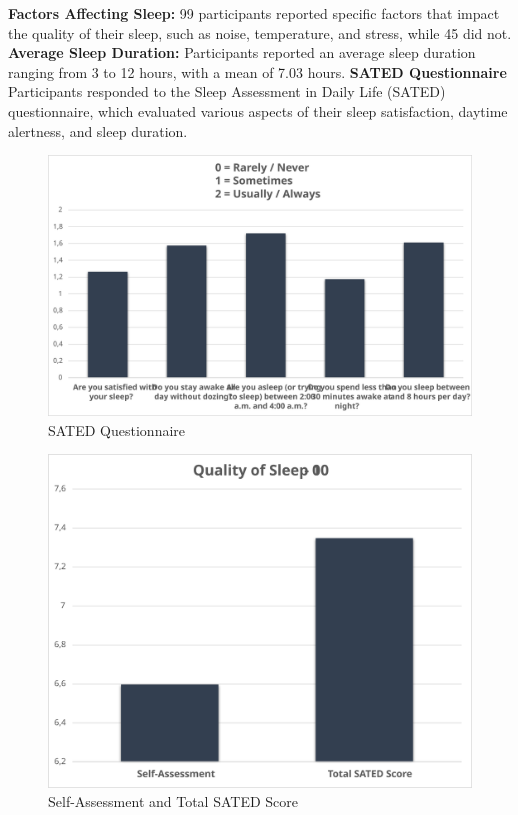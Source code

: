 \documentclass[
  a4paper,  %
  twoside,  %
  bibliography=totoc,
  headsepline,
  cleardoublepage=empty,
  parskip=half,
  draft=false
]{scrbook}
\begin{document}
    \textbf{Factors Affecting Sleep:} 99 participants reported specific factors that impact the quality of their sleep, such as noise, temperature, and stress, while 45 did not.
    \textbf{Average Sleep Duration:} Participants reported an average sleep duration ranging from 3 to 12 hours, with a mean of 7.03 hours.
    \textbf{SATED Questionnaire}
    Participants responded to the Sleep Assessment in Daily Life (SATED) questionnaire, which evaluated various aspects of their sleep satisfaction, daytime alertness, and sleep duration.
    \begin{figure}
        \centering
        \includegraphics[scale = 0.2]{graphics/SATED_Charts.svg}
        \caption{SATED Questionnaire}
    \end{figure}

    \begin{figure}
        \centering
        \includegraphics[scale=0.24]{graphics/SATEDvsSELF.svg}
        \caption{Self-Assessment and Total SATED Score}
    \end{figure}
\end{document}

